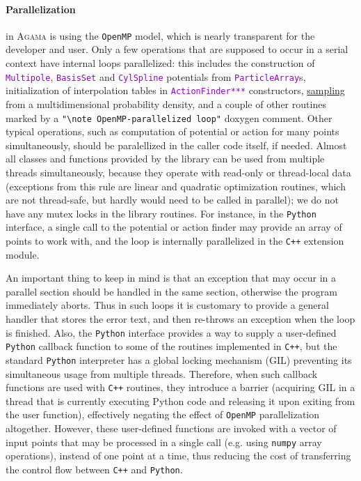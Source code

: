\documentclass[12pt]{article}
\newcommand{\Agama}{\textsc{Agama}\xspace}
\newcommand{\Cpp}  {\texttt{C++}\xspace}
\newcommand{\Python}{\texttt{Python}\xspace}
\newcommand{\ttt}[1]{\textcolor{darkviolet}{\texttt{#1}}}
\begin{document}
\paragraph{Parallelization}  in \Agama is using the \texttt{OpenMP} model, which is nearly transparent for the developer and user. Only a few operations that are supposed to occur in a serial context have internal loops parallelized: this includes the construction of \ttt{Multipole}, \ttt{BasisSet} and \ttt{CylSpline} potentials from \ttt{ParticleArray}s, initialization of interpolation tables in \ttt{ActionFinder***} constructors, \hyperref[sec:Sampling]{sampling} from a multidimensional probability density, and a couple of other routines marked by a \texttt{"\textbackslash note OpenMP-parallelized loop"} doxygen comment. 
Other typical operations, such as computation of potential or action for many points simultaneously, should be paralellized in the caller code itself, if needed. Almost all classes and functions provided by the library can be used from multiple threads simultaneously, because they operate with read-only or thread-local data (exceptions from this rule are linear and quadratic optimization routines, which are not thread-safe, but hardly would need to be called in parallel); we do not have any mutex locks in the library routines.
For instance, in the \Python interface, a single call to the potential or action finder may provide an array of points to work with, and the loop is internally parallelized in the \Cpp extension module. 

An important thing to keep in mind is that an exception that may occur in a parallel section should be handled in the same section, otherwise the program immediately aborts. Thus in such loops it is customary to provide a general handler that stores the error text, and then re-throws an exception when the loop is finished.
Also, the \Python interface provides a way to supply a user-defined \Python callback function to some of the routines implemented in \Cpp, but the standard \Python interpreter has a global locking mechanism (GIL) preventing its simultaneous usage from multiple threads. Therefore, when such callback functions are used with \Cpp routines, they introduce a barrier (acquiring GIL in a thread that is currently executing Python code and releasing it upon exiting from the user function), effectively negating the effect of \texttt{OpenMP} parallelization altogether. However, these user-defined functions are invoked with a vector of input points that may be processed in a single call (e.g. using \texttt{numpy} array operations), instead of one point at a time, thus reducing the cost of transferring the control flow between \Cpp and \Python.
\end{document}
